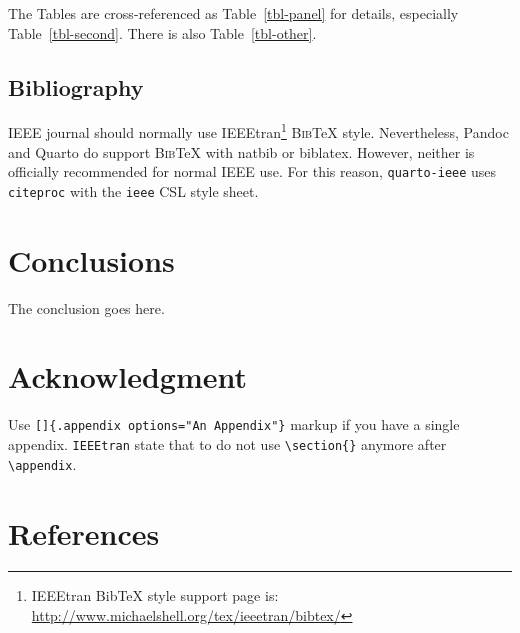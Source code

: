 \documentclass[
  journal,
]{IEEEtran}%
\begin{document}
The Tables are cross-referenced as Table~\ref{tbl-panel} for details,
especially Table~\ref{tbl-second}. There is also Table~\ref{tbl-other}.

\subsection{Bibliography}\label{bibliography}

IEEE journal should normally use IEEEtran\footnote{IEEEtran BibTeX style
  support page is:
  \url{http://www.michaelshell.org/tex/ieeetran/bibtex/}}
\textsc{Bib}{\TeX} style. Nevertheless, Pandoc and Quarto do support
\textsc{Bib}{\TeX} with natbib or biblatex. However, neither is
officially recommended for normal IEEE use. For this reason,
\texttt{quarto-ieee} uses \texttt{citeproc} with the \texttt{ieee} CSL
style sheet.

\section{Conclusions}\label{conclusions}

The conclusion goes here.

\section*{Acknowledgment}\label{acknowledgment}

\appendix[An Appendix]{}

Use \texttt{{[}{]}\{.appendix\ options="An\ Appendix"\}} markup if you
have a single appendix. \texttt{IEEEtran} state that to do not use
\texttt{\textbackslash{}section\{\}} anymore after
\texttt{\textbackslash{}appendix}.

\section*{References}\label{references}
\end{document}
